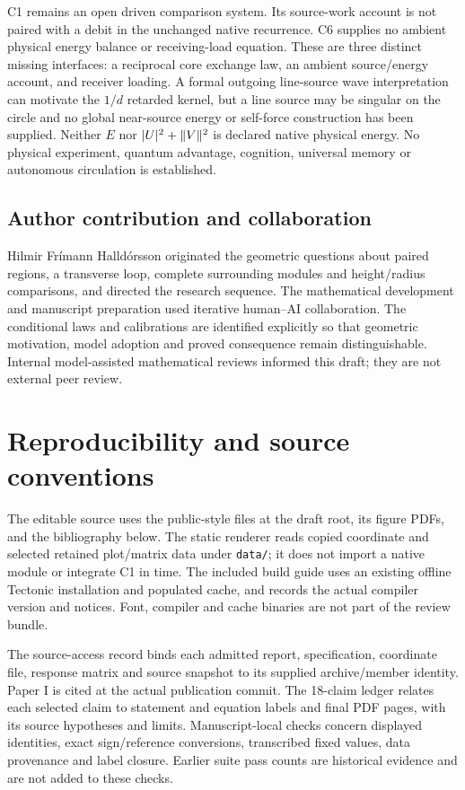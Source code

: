 C1 remains an open driven comparison system. Its source-work account is not paired with a debit in the unchanged native recurrence. C6 supplies no ambient physical energy balance or receiving-load equation. These are three distinct missing interfaces: a reciprocal core exchange law, an ambient source/energy account, and receiver loading. A formal outgoing line-source wave interpretation can motivate the $1/d$ retarded kernel, but a line source may be singular on the circle and no global near-source energy or self-force construction has been supplied. Neither $E$ nor $|U|^2+\lVert V\rVert^2$ is declared native physical energy. No physical experiment, quantum advantage, cognition, universal memory or autonomous circulation is established.

\subsection*{Author contribution and collaboration}
Hilmir Fr\'imann Halld\'orsson originated the geometric questions about paired regions, a transverse loop, complete surrounding modules and height/radius comparisons, and directed the research sequence. The mathematical development and manuscript preparation used iterative human--AI collaboration. The conditional laws and calibrations are identified explicitly so that geometric motivation, model adoption and proved consequence remain distinguishable. Internal model-assisted mathematical reviews informed this draft; they are not external peer review.

\appendix
\section{Reproducibility and source conventions}\label{app:repro}
The editable source uses the public-style files at the draft root, its figure PDFs, and the bibliography below. The static renderer reads copied coordinate and selected retained plot/matrix data under \texttt{data/}; it does not import a native module or integrate C1 in time. The included build guide uses an existing offline Tectonic installation and populated cache, and records the actual compiler version and notices. Font, compiler and cache binaries are not part of the review bundle.

The source-access record binds each admitted report, specification, coordinate file, response matrix and source snapshot to its supplied archive/member identity. Paper I is cited at the actual publication commit. The 18-claim ledger relates each selected claim to statement and equation labels and final PDF pages, with its source hypotheses and limits. Manuscript-local checks concern displayed identities, exact sign/reference conversions, transcribed fixed values, data provenance and label closure. Earlier suite pass counts are historical evidence and are not added to these checks.

